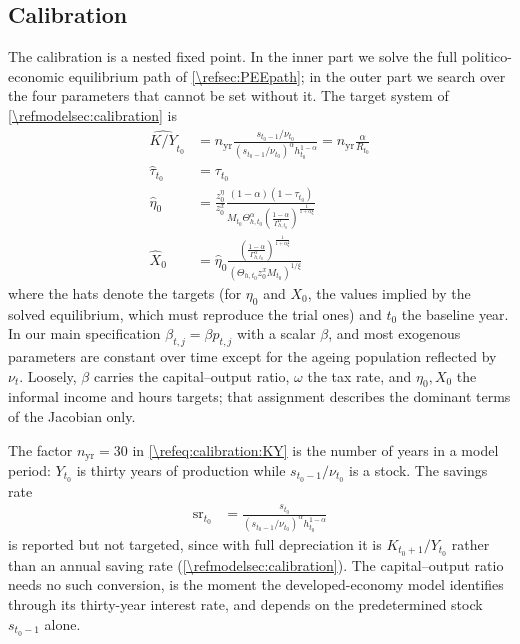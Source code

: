 \subsection{Calibration}\label{\refsec:calibration}
The calibration is a nested fixed point. In the inner part we solve the full politico-economic equilibrium path of \cref{\refsec:PEEpath}; in the outer part we search over the four parameters that cannot be set without it. The target system of \cref{\refmodelsec:calibration} is
\begin{subequations}\label{\refeq:calibration}
    \begin{align}
        \widehat{K/Y}_{t_0} &= n_{\text{yr}}\frac{s_{t_0-1}/\nu_{t_0}}{\left(s_{t_0-1}/\nu_{t_0}\right)^{\alpha} h_{t_0}^{1-\alpha}} = n_{\text{yr}}\frac{\alpha}{R_{t_0}} \label{\refeq:calibration:KY}\\
        \hat{\tau}_{t_0} &= \tau_{t_0} \label{\refeq:calibration:tau}\\
        \hat{\eta}_{0} &= \frac{z_0^{\eta}}{z_0^x}\frac{(1-\alpha)(1-\tau_{t_0})}{M_{t_0}\Theta_{h,t_0}^{\alpha}\left(\frac{1-\alpha}{\Gamma_{h,t_0}^{\alpha}}\right)^{\frac{1}{1+\alpha\xi}}} \label{\refeq:calibration:eta0}\\
        \hat{X}_{0} &= \hat{\eta}_{0}\frac{\left(\frac{1-\alpha}{\Gamma_{h,t_0}^{\alpha}}\right)^{\frac{1}{1+\alpha\xi}}}{\left(\Theta_{h,t_0}z_0^xM_{t_0}\right)^{1/\xi}} \label{\refeq:calibration:X0}
    \end{align}
\end{subequations}
where the hats denote the targets (for $\eta_0$ and $X_0$, the values implied by the solved equilibrium, which must reproduce the trial ones) and $t_0$ the baseline year. In our main specification $\beta_{t,j} = \beta p_{t,j}$ with a scalar $\beta$, and most exogenous parameters are constant over time except for the ageing population reflected by $\nu_t$. Loosely, $\beta$ carries the capital--output ratio, $\omega$ the tax rate, and $\eta_0, X_0$ the informal income and hours targets; that assignment describes the dominant terms of the Jacobian only.

The factor $n_{\text{yr}}=30$ in \eqref{\refeq:calibration:KY} is the number of years in a model period: $Y_{t_0}$ is thirty years of production while $s_{t_0-1}/\nu_{t_0}$ is a stock. The savings rate
\begin{align}
    \text{sr}_{t_0} &= \frac{s_{t_0}}{\left(s_{t_0-1}/\nu_{t_0}\right)^{\alpha} h_{t_0}^{1-\alpha}} \label{\refeq:calibration:sr}
\end{align}
is reported but not targeted, since with full depreciation it is $K_{t_0+1}/Y_{t_0}$ rather than an annual saving rate (\cref{\refmodelsec:calibration}). The capital--output ratio needs no such conversion, is the moment the developed-economy model identifies through its thirty-year interest rate, and depends on the predetermined stock $s_{t_0-1}$ alone.

